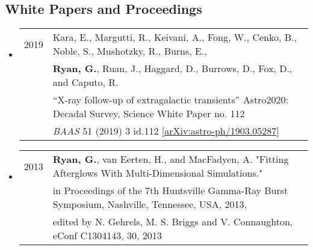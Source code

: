 \subsection*{White Papers and Proceedings}
\begin{itemize}

\item \begin{tabular}{ll}
2019 & {Kara}, E., {Margutti}, R., {Keivani}, A., {Fong}, W., {Cenko}, B., {Noble}, S., {Mushotzky}, R., {Burns}, E., \\
	& {\bf {Ryan}, G.}, {Ruan}, J.,  {Haggard}, D., {Burrows}, D., {Fox}, D., and {Caputo}, R. \\
	& ``{X-ray follow-up of extragalactic transients}'' Astro2020: Decadal Survey, Science White Paper no. 112 \\
	& \emph{BAAS} 51 (2019) 3 id.112 [\href{https://arxiv.org/abs/1903.05287}{arXiv:astro-ph/1903.05287}]
\end{tabular}
\item \begin{tabular}{ll}
2013 & {\bf Ryan, G.}, van Eerten, H., and MacFadyen, A. "Fitting Afterglows With Multi-Dimensional Simulations." \\& in Proceedings of the 7th Huntsville Gamma-Ray Burst Symposium, Nashville, Tennessee, USA, 2013, \\& edited by N. Gehrels, M. S. Briggs and V. Connaughton, eConf C1304143, 30, 2013 \\
\end{tabular}
\end{itemize}

